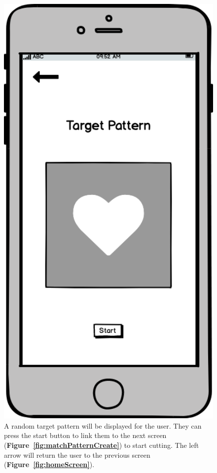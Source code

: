 \documentclass[11pt]{article}
\begin{document}
           \begin{figure}
                \begin{minipage}[c]{0.35\textwidth}
                \includegraphics[width=1\textwidth]{Images/Prototype/prototypeTarget}
                \end{minipage}\hfill
                \begin{minipage}[c]{0.65\textwidth}
                \caption{A random target pattern will be displayed for the user. They can press the start button to link them to the next screen (\textbf{Figure~\ref{fig:matchPatternCreate}}) to start cutting. The left arrow will return the user to the previous screen (\textbf{Figure~\ref{fig:homeScreen}}).}
                \label{fig:target}
                \end{minipage}
            \end{figure}
                           
\end{document}
